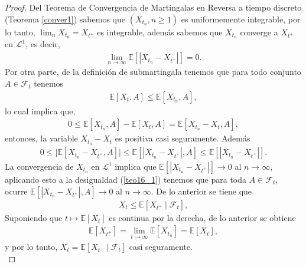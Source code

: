 \begin{proof}
Del Teorema de Convergencia de Martingalas en Reversa a tiempo discreto (Teorema \ref{conver1}) sabemos que $(X_{t_n}, n \geq 1)$ es uniformemente integrable, por lo tanto, $\lim_{n} X_{t_n} = X_{t^{+}}$ es integrable, además sabemos que $X_{t_n}$ converge a $X_{t^{+}}$ en $\mathcal{L}^1$, es decir, 
\begin{align*}
	\lim_{n \rightarrow \infty} \mathbb{E}[|X_{t_n} - X_{t^{+}}|] = 0.
\end{align*}
Por otra parte, de la definición de submartingala tenemos que para todo conjunto $A \in \mathcal{F}_t$ tenemos
\begin{align*}
	\mathbb{E}[X_t, A] \leq \mathbb{E}[X_{t_n}, A],
\end{align*}
lo cual implica que, 
\begin{align*}
	0 \leq \mathbb{E}[X_{t_n}, A] - \mathbb{E}[X_t, A] = \mathbb{E}[X_{t_n} - X_t, A], 
\end{align*}
entonces, la variable $X_{t_n} - X_t$ es positiva casi seguramente. Además
\begin{align}
	0 \leq \bigg| \mathbb{E}[X_{t_n} - X_{t^{+}}, A] \bigg| \leq \mathbb{E} \left[ |X_{t_n} - X_{t^{+}}|, A \right] \leq \mathbb{E} \left[ |X_{t_n} - X_{t^{+}}|\right]. \label{teo16_1}
\end{align}
La convergencia de $X_{t_n}$ en $\mathcal{L}^{1}$ implica que $\mathbb{E}[|X_{t_n} - X_{t^{+}}|] \rightarrow 0$ al $n \rightarrow \infty$, aplicando esto a la desigualdad (\ref{teo16_1}) tenemos que para toda $A \in \mathcal{F}_t$, ocurre $\mathbb{E}[|X_{t_n} - X_{t^{+}}|, A] \rightarrow 0$ al $n \rightarrow \infty$. De lo anterior se tiene que
\begin{align*}
	X_t \leq \mathbb{E} [ X_{t^{+}} \mid \mathcal{F}_t ], 
\end{align*}
Suponiendo que $t \mapsto \mathbb{E}[X_t]$ es continua por la derecha, de lo anterior se obtiene
\begin{align*}
	\mathbb{E}[X_{t^{+}}] = \lim_{t \rightarrow \infty} \mathbb{E}[X_{t_n}] = \mathbb{E}[X_t],
\end{align*}
y por lo tanto, $X_t = \mathbb{E} [X_{t^{+}} \mid \mathcal{F}_t]$ casi seguramente. \\


\end{proof}
